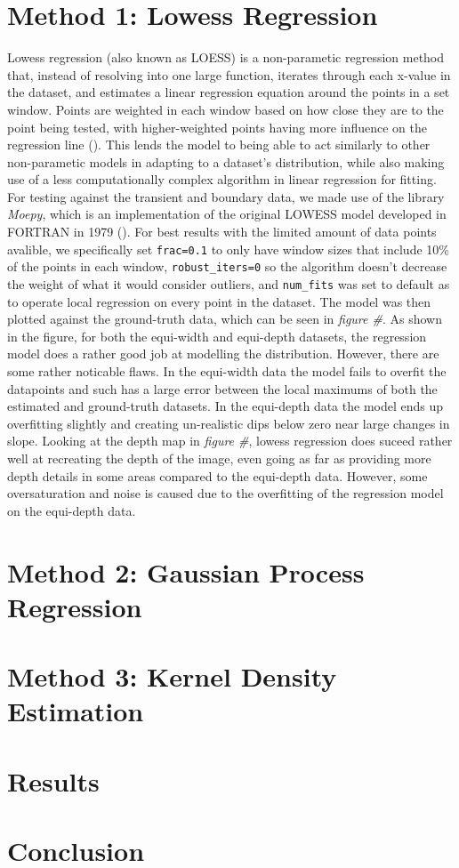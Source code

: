 \documentclass[letterpaper,12pt]{article}
\begin{document}
\section{Method 1: Lowess Regression}
Lowess regression (also known as LOESS) is a non-parametic regression method that, instead 
of resolving into one large function, iterates through each x-value in the dataset, and 
estimates a linear regression equation around the points in a set window. Points are 
weighted in each window based on how close they are to the point being tested, with 
higher-weighted points having more influence on the regression line (\cite{Figueira_2021}). 
This lends the model to being able to act similarly to other non-parametic models in adapting
to a dataset's distribution, while also making use of a less computationally complex algorithm
in linear regression for fitting. For testing against the transient and boundary data, we
made use of the library \emph{Moepy}, which is an implementation of the original LOWESS model 
developed in FORTRAN in 1979 (\cite{ayrton_bourn_2021_4812979}). For best results with the
limited amount of data points avalible, we specifically set \verb|frac=0.1| to only have window
sizes that include 10\% of the points in each window, \verb|robust_iters=0| so the algorithm
doesn't decrease the weight of what it would consider outliers, and \verb|num_fits| was set
to default as to operate local regression on every point in the dataset. The model was
then plotted against the ground-truth data, which can be seen in \emph{figure \#}. As shown
in the figure, for both the equi-width and equi-depth datasets, the regression model does
a rather good job at modelling the distribution. However, there are some rather noticable flaws.
In the equi-width data the model fails to overfit the datapoints and such has a large error
between the local maximums of both the estimated and ground-truth datasets. In the equi-depth
data the model ends up overfitting slightly and creating un-realistic dips below zero near large
changes in slope. Looking at the depth map in \emph{figure \#}, lowess regression does suceed
rather well at recreating the depth of the image, even going as far as providing more depth details
in some areas compared to the equi-depth data. However, some oversaturation and noise is caused
due to the overfitting of the regression model on the equi-depth data.

\section{Method 2: Gaussian Process Regression}

\section{Method 3: Kernel Density Estimation}

\section{Results}

\section{Conclusion}

\nocite{*}
\printbibliography
\end{document}

